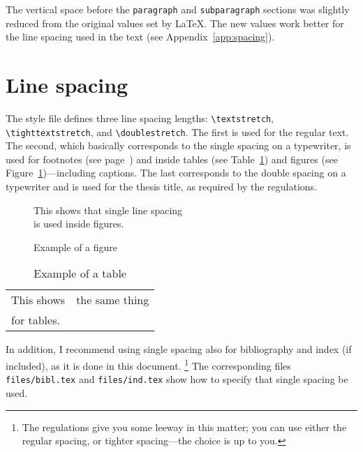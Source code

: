 The vertical space before the
\verb+paragraph+ and
\verb+subparagraph+ sections
was slightly reduced from the original values set by \LaTeX{}. The new
values work better for the line spacing used in the text (see
Appendix~\ref{app:spacing}).

\section{Line spacing}
\label{spacing}

The style file defines three line spacing lengths:
\verb+\textstretch+, \verb+\tighttextstretch+, and
\verb+\doublestretch+. The first is used for the regular text. The
second, which basically corresponds to the single spacing%
on a typewriter, is used for footnotes (see
page~\pageref{foot}) and inside tables (see
Table~\ref{tab1}) and figures (see
Figure~\ref{fig1})---including captions.
The last corresponds to the double spacing on a
typewriter and is used for the thesis title, as required by the
regulations.

\begin{figure}[htbp]
  \begin{center}
    This shows that single line spacing\\
    is used inside figures.
    \caption{Example of a figure\label{fig1}}
  \end{center}
\end{figure}
%
\vspace*{-.3in}
\begin{table}[htbp]
  \begin{center}
    \begin{tabular}[t]{|ll|}
      \hline
      This shows & the same thing\\
      for tables. & \\
      \hline
    \end{tabular}    
    \caption{Example of a table\label{tab1}}
  \end{center}
\end{table}

In addition, I recommend using single spacing also for
bibliography and index%
 (if included), as it is done in this
document.%
\footnote{The regulations give you some leeway in this matter; you can
  use either the regular spacing, or tighter spacing---the choice is
  up to you.} The corresponding files
\texttt{files/bibl.tex} and
\texttt{files/ind.tex} show how to specify
that single spacing be used.



